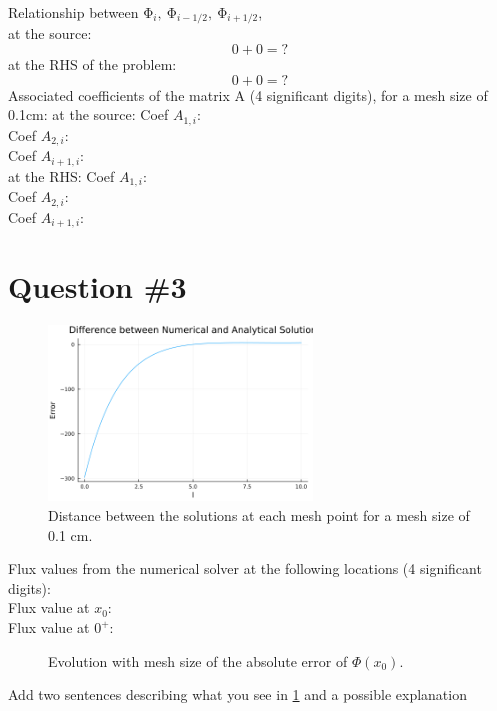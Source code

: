 \documentclass[11pt,a4paper]{article}
\begin{document}
Relationship between $\mathrm{\Phi}_i,\ \mathrm{\Phi}_{i-1/2},\ \mathrm{\Phi}_{i+1/2}$, \\
at the source:
\begin{equation}
    0+0=?
\end{equation}
at the RHS of the problem:
\begin{equation}
    0+0=?
\end{equation}
Associated coefficients of the matrix A (4 significant digits), for a mesh size of 0.1cm:
at the source:
Coef $A_{1,i}$: \\
Coef $A_{2,i}$: \\
Coef $A_{i+1,i}$: \\
at the RHS:
Coef $A_{1,i}$: \\
Coef $A_{2,i}$: \\
Coef $A_{i+1,i}$: \\

\section{Question \#3}
\begin{figure}[h]
\includegraphics[width=7cm]{../figs/ex1_err_100.png}
\centering
\caption{Distance between the solutions at each mesh point for a mesh size of 0.1 cm.}
\end{figure}

Flux values from the numerical solver at the following locations (4 significant digits):\\
Flux value at $x_0$: \\
Flux value at $0^+$: \\

\begin{figure}[h]
\centering
\caption{Evolution with mesh size of the absolute error of $\Phi(x_0)$.}
\label{err}
\end{figure}

Add two sentences describing what you see in \ref{err} and a possible explanation 


\end{document}
